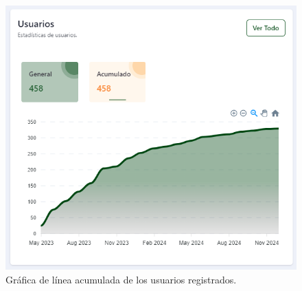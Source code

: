 \begin{figure}[H]
    \begin{center}
        \includegraphics[scale=0.40]{img/actividades/dahsboard-admin/usuarios-acumulado.png}
        \caption{Gráfica de línea acumulada de los usuarios registrados.}
        \label{fig:usuarios-acumulado}
    \end{center}
\end{figure}